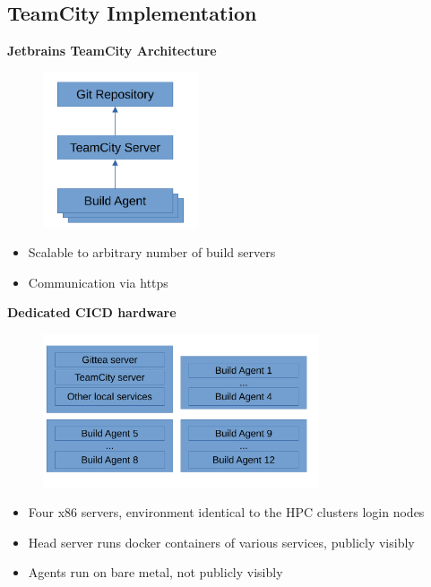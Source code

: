 \documentclass[english,xcolor=pst,11pt]{beamer}
\begin{document}
\begin{frame}

\section{TeamCity Implementation}
\textbf{Jetbrains TeamCity Architecture}
\begin{figure}[H]
	\centering
    {\includegraphics[width=1.8in]{diagrams/teamcity.pdf}}
\end{figure}
\vfill
\begin{itemize}
 \item Scalable to arbitrary number of build servers
 \item Communication via https
\end{itemize}




\end{frame}

\begin{frame}
\textbf{Dedicated CICD hardware}
 \begin{figure}[H]
	\centering
    {\includegraphics[width=3.2in]{diagrams/hardware.pdf}}
\end{figure}

\begin{itemize}
 \item Four x86 servers, environment identical to the HPC clusters login nodes
 \item Head server runs docker containers of various services, publicly visibly
 \item Agents run on bare metal, not publicly visibly
\end{itemize}

\end{frame}
\end{document}
